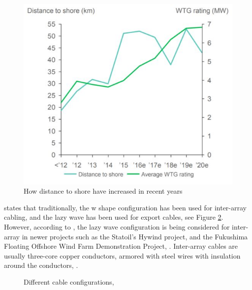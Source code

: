 \begin{figure}[H]
\centering
\includegraphics[scale=0.9]{figures/distshore}
\caption[$\; \:$Distance to shore ]{How distance to shore have increased in recent years \cite{Make2016}}
 \label{fig:distshore}
\end{figure}

\noindent \cite{srinil2016} states that traditionally, the w shape configuration has been used for inter-array cabling, and the lazy wave has been used for export cables, see Figure \ref{fig:cableconfig}. However, according to \cite{ds2010}, the lazy wave configuration is being considered for inter-array in newer projects such as the Statoil's Hywind project, and the Fukushima Floating Offshore Wind
Farm Demonstration Project, \cite{yagihashi2015dynamic}. Inter-array cables are usually three-core copper conductors, armored with steel wires with insulation around the conductors, \cite{srinil2016}. 


\begin{figure}[H]
\hfill
{}\hfill
\caption[$\; \:$Cable configurations]{Different cable configurations, \cite{ds2010}}
\label{fig:cableconfig}
\end{figure}

